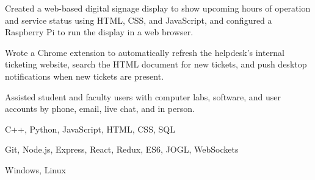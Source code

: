 \documentclass[10pt]{article}
\begin{document}
\begin{bullets}
  \item Created a web-based digital signage display to show upcoming hours of operation and service status using
        HTML, CSS, and JavaScript, and configured a Raspberry Pi to run the display in a web browser.
  \item Wrote a Chrome extension to automatically refresh the helpdesk's internal ticketing website, search the
        HTML document for new tickets, and push desktop notifications when new tickets are present.
  \item Assisted student and faculty users with computer labs, software, and user accounts by phone, email, live
        chat, and in person.
\end{bullets}

\begin{bullets}
  \item {} C++, Python, JavaScript, HTML, CSS, SQL
  \item {} Git, Node.js, Express, React, Redux, ES6, JOGL, WebSockets
  \item {} Windows, Linux
\end{bullets}
\end{document}
